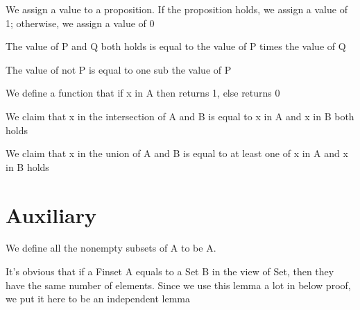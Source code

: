 \begin{definition}\label{toInt}
  \leanok
          We assign a value to a proposition. If the proposition holds, we assign a value of 1; otherwise, we assign a value of 0
\end{definition}

\begin{lemma}\label{toInt_and}
          The value of P and Q both holds is equal to the value of P times the value of Q
\end{lemma}

\begin{lemma}\label{toInt_not}
          The value of not P is equal to one sub the value of P
\end{lemma}

\begin{definition}\label{char_fun}
  \leanok
          We define a function that if x in A then returns 1, else returns 0
\end{definition}

\begin{lemma}\label{char_fun_inter}
          We claim that x in the intersection of A and B is equal to x in A and x in B both holds
\end{lemma}

\begin{lemma}\label{char_fun_union}
          We claim that x in the union of A and B is equal to at least one of x in A and x in B holds
\end{lemma}
\section{Auxiliary}

\begin{definition}\label{Finset.powerset₀}
  \leanok
          We define all the nonempty subsets of A to be A.
\end{definition}

\begin{lemma}\label{card_eq}
          It's obvious that if a Finset A equals to a Set B in the view of Set, then they have the same number of elements. Since we use this lemma a lot in below proof, we put it here to be an independent lemma
\end{lemma}

